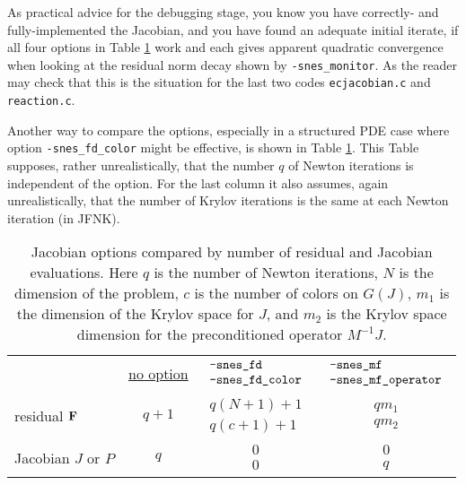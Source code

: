 As practical advice for the debugging stage, you know you have correctly- and fully-implemented the Jacobian, and you have found an adequate initial iterate, if all four options in Table \ref{tab:snesjacobianoptions:evals} work and each gives apparent quadratic convergence when looking at the residual norm decay shown by \texttt{-snes\_monitor}.  As the reader may check that this is the situation for the last two codes \texttt{ecjacobian.c} and \texttt{reaction.c}.

Another way to compare the options, especially in a structured PDE case where option \texttt{-snes\_fd\_color} might be effective, is shown in Table \ref{tab:snesjacobianoptions:evals}.  This Table supposes, rather unrealistically, that the number $q$ of Newton iterations is independent of the option.  For the last column it also assumes, again unrealistically, that the number of Krylov iterations is the same at each Newton iteration (in JFNK).

\begin{table}
\begin{tabular}{lccc}
 &\underline{no option}
                       & \small\underline{$\begin{array}{ll} \text{\texttt{-snes\_fd}} \\ \text{\texttt{-snes\_fd\_color}} \end{array}$}
                                    & \small\underline{$\begin{array}{ll} \text{\texttt{-snes\_mf}} \\ \text{\texttt{-snes\_mf\_operator}} \end{array}$} \vspace{0.2in} \\
residual $\mathbf{F}$        & $q+1$ & $\begin{array}{cc} q(N+1)+1 \\ q(c+1)+1 \end{array}$ & $\begin{array}{cc} q m_1 \\ q m_2 \end{array}$ \vspace{0.1in} \\
Jacobian $J$ or $P$    & $q$ & $\begin{array}{cc} 0 \\ 0 \end{array}$ & $\begin{array}{cc} 0 \\ q \end{array}$
\end{tabular}
\caption{Jacobian options compared by number of residual and Jacobian evaluations.  Here $q$ is the number of Newton iterations, $N$ is the dimension of the problem, $c$ is the number of colors on $G(J)$, $m_1$ is the dimension of the Krylov space for $J$, and $m_2$ is the Krylov space dimension for the preconditioned operator $M^{-1}J$.} \label{tab:snesjacobianoptions:evals}
\end{table}

